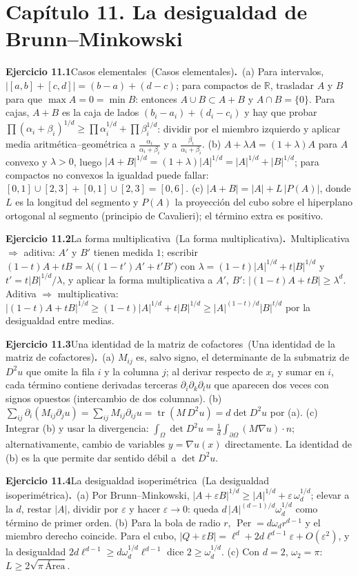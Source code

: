 \documentclass[11pt,a4paper]{amsart}
\newcommand{\ve}{\varepsilon}
\newcommand{\R}{{\mathbb R}}
\theoremstyle{remark}
\theoremstyle{definition}
\numberwithin{subsection}{section}
\numberwithin{equation}{section}
\newcommand{\ejlabel}[2]{\par\medskip\noindent\textbf{Ejercicio #1}\ifx\relax#2\relax\else\ (#2)\fi\textbf{.}\ }
\begin{document}
\section*{Capítulo 11. La desigualdad de Brunn--Minkowski}
\ejlabel{11.1}{Casos elementales}(a) Para intervalos, $|[a,b]+[c,d]|=(b-a)+(d-c)$; para compactos de $\R$, trasladar $A$ y $B$ para que $\max A=0=\min B$: entonces $A\cup B\subset A+B$ y $A\cap B=\{0\}$. Para cajas, $A+B$ es la caja de lados $(b_i-a_i)+(d_i-c_i)$ y hay que probar $\prod(\alpha_i+\beta_i)^{1/d}\ge\prod\alpha_i^{1/d}+\prod\beta_i^{1/d}$: dividir por el miembro izquierdo y aplicar media aritmética--geométrica a $\frac{\alpha_i}{\alpha_i+\beta_i}$ y a $\frac{\beta_i}{\alpha_i+\beta_i}$. (b) $A+\lambda A=(1+\lambda)A$ para $A$ convexo y $\lambda>0$, luego $|A+B|^{1/d}=(1+\lambda)|A|^{1/d}=|A|^{1/d}+|B|^{1/d}$; para compactos no convexos la igualdad puede fallar: $[0,1]\cup[2,3]+[0,1]\cup[2,3]=[0,6]$. (c) $|A+B|=|A|+L\,|P(A)|$, donde $L$ es la longitud del segmento y $P(A)$ la proyección del cubo sobre el hiperplano ortogonal al segmento (principio de Cavalieri); el término extra es positivo.

\ejlabel{11.2}{La forma multiplicativa}Multiplicativa $\Rightarrow$ aditiva: $A'$ y $B'$ tienen medida $1$; escribir $(1-t)A+tB=\lambda\bigl((1-t')A'+t'B'\bigr)$ con $\lambda=(1-t)|A|^{1/d}+t|B|^{1/d}$ y $t'=t|B|^{1/d}/\lambda$, y aplicar la forma multiplicativa a $A'$, $B'$: $|(1-t)A+tB|\ge\lambda^d$. Aditiva $\Rightarrow$ multiplicativa: $|(1-t)A+tB|^{1/d}\ge(1-t)|A|^{1/d}+t|B|^{1/d}\ge|A|^{(1-t)/d}|B|^{t/d}$ por la desigualdad entre medias.

\ejlabel{11.3}{Una identidad de la matriz de cofactores}(a) $M_{ij}$ es, salvo signo, el determinante de la submatriz de $D^2u$ que omite la fila $i$ y la columna $j$; al derivar respecto de $x_i$ y sumar en $i$, cada término contiene derivadas terceras $\partial_i\partial_k\partial_lu$ que aparecen dos veces con signos opuestos (intercambio de dos columnas). (b) $\sum_{ij}\partial_i(M_{ij}\partial_ju)=\sum_{ij}M_{ij}\partial_{ij}u=\operatorname{tr}(M\,D^2u)=d\det D^2u$ por (a). (c) Integrar (b) y usar la divergencia: $\int_\Omega\det D^2u=\frac1d\int_{\partial\Omega}(M\nabla u)\cdot n$; alternativamente, cambio de variables $y=\nabla u(x)$ directamente. La identidad de (b) es la que permite dar sentido débil a $\det D^2u$.

\ejlabel{11.4}{La desigualdad isoperimétrica}(a) Por Brunn--Minkowski, $|A+\ve B|^{1/d}\ge|A|^{1/d}+\ve\,\omega_d^{1/d}$; elevar a la $d$, restar $|A|$, dividir por $\ve$ y hacer $\ve\to0$: queda $d\,|A|^{(d-1)/d}\omega_d^{1/d}$ como término de primer orden. (b) Para la bola de radio $r$, $\operatorname{Per}=d\omega_dr^{d-1}$ y el miembro derecho coincide. Para el cubo, $|Q+\ve B|=\ell^d+2d\ell^{d-1}\ve+O(\ve^2)$, y la desigualdad $2d\ell^{d-1}\ge d\omega_d^{1/d}\ell^{d-1}$ dice $2\ge\omega_d^{1/d}$. (c) Con $d=2$, $\omega_2=\pi$: $L\ge2\sqrt{\pi\,\text{Área}}$.
\end{document}
